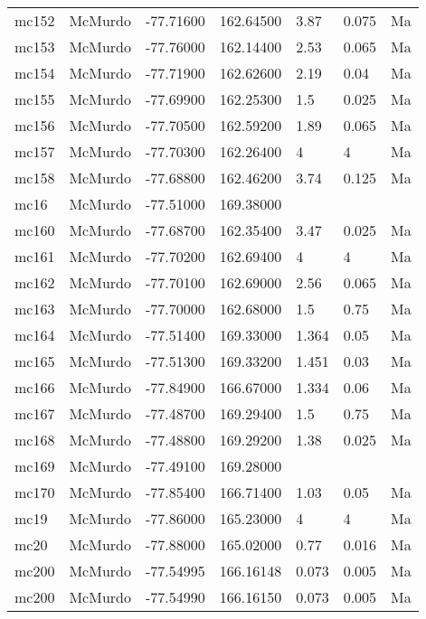 \documentclass{article}
\begin{document}
\begin{longtable}{llrrlll}
 mc152 &  McMurdo & -77.71600 &  162.64500 &    3.87 &     0.075 &    Ma \\
 mc153 &  McMurdo & -77.76000 &  162.14400 &    2.53 &     0.065 &    Ma \\
 mc154 &  McMurdo & -77.71900 &  162.62600 &    2.19 &      0.04 &    Ma \\
 mc155 &  McMurdo & -77.69900 &  162.25300 &     1.5 &     0.025 &    Ma \\
 mc156 &  McMurdo & -77.70500 &  162.59200 &    1.89 &     0.065 &    Ma \\
 mc157 &  McMurdo & -77.70300 &  162.26400 &       4 &         4 &    Ma \\
 mc158 &  McMurdo & -77.68800 &  162.46200 &    3.74 &     0.125 &    Ma \\
  mc16 &  McMurdo & -77.51000 &  169.38000 &         &           &       \\
 mc160 &  McMurdo & -77.68700 &  162.35400 &    3.47 &     0.025 &    Ma \\
 mc161 &  McMurdo & -77.70200 &  162.69400 &       4 &         4 &    Ma \\
 mc162 &  McMurdo & -77.70100 &  162.69000 &    2.56 &     0.065 &    Ma \\
 mc163 &  McMurdo & -77.70000 &  162.68000 &     1.5 &      0.75 &    Ma \\
 mc164 &  McMurdo & -77.51400 &  169.33000 &   1.364 &      0.05 &    Ma \\
 mc165 &  McMurdo & -77.51300 &  169.33200 &   1.451 &      0.03 &    Ma \\
 mc166 &  McMurdo & -77.84900 &  166.67000 &   1.334 &      0.06 &    Ma \\
 mc167 &  McMurdo & -77.48700 &  169.29400 &     1.5 &      0.75 &    Ma \\
 mc168 &  McMurdo & -77.48800 &  169.29200 &    1.38 &     0.025 &    Ma \\
 mc169 &  McMurdo & -77.49100 &  169.28000 &         &           &       \\
 mc170 &  McMurdo & -77.85400 &  166.71400 &    1.03 &      0.05 &    Ma \\
  mc19 &  McMurdo & -77.86000 &  165.23000 &       4 &         4 &    Ma \\
  mc20 &  McMurdo & -77.88000 &  165.02000 &    0.77 &     0.016 &    Ma \\
 mc200 &  McMurdo & -77.54995 &  166.16148 &   0.073 &     0.005 &    Ma \\
 mc200 &  McMurdo & -77.54990 &  166.16150 &   0.073 &     0.005 &    Ma \\

\end{longtable}
\end{document}
